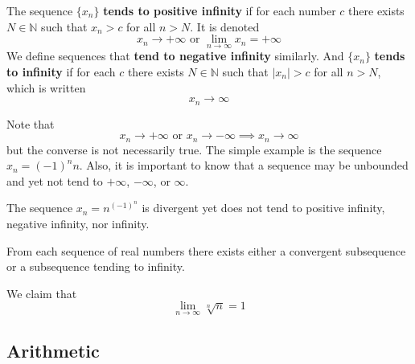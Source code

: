     \begin{definition}
      The sequence $\{x_n\}$ \textbf{tends to positive infinity} if for each number $c$ there exists $N \in \mathbb{N}$ such that $x_n > c$ for all $n > N$. It is denoted 
      \begin{equation}
        x_n \rightarrow + \infty \text{ or } \lim_{n \rightarrow \infty} x_n = + \infty
      \end{equation}
      We define sequences that \textbf{tend to negative infinity} similarly. And $\{x_n\}$ \textbf{tends to infinity} if for each $c$ there exists $N \in \mathbb{N}$ such that $|x_n| > c$ for all $n > N$, which is written 
      \begin{equation}
        x_n \rightarrow \infty
      \end{equation}
    \end{definition}

    Note that 
    \begin{equation}
      x_n \rightarrow +\infty \text{ or } x_n \rightarrow -\infty \implies x_n \rightarrow \infty
    \end{equation}
    but the converse is not necessarily true. The simple example is the sequence $x_n = (-1)^n n$. Also, it is important to know that a sequence may be unbounded and yet not tend to $+\infty$, $-\infty$, or $\infty$. 

    \begin{example}
      The sequence $x_n = n^{(-1)^n}$ is divergent yet does not tend to positive infinity, negative infinity, nor infinity. 
    \end{example}

    \begin{corollary}
      From each sequence of real numbers there exists either a convergent subsequence or a subsequence tending to infinity. 
    \end{corollary}

    \begin{example}
      We claim that
      \begin{equation}
        \lim_{n\rightarrow \infty} \sqrt[n]{n} = 1
      \end{equation}
    \end{example}

\subsection{Arithmetic}

